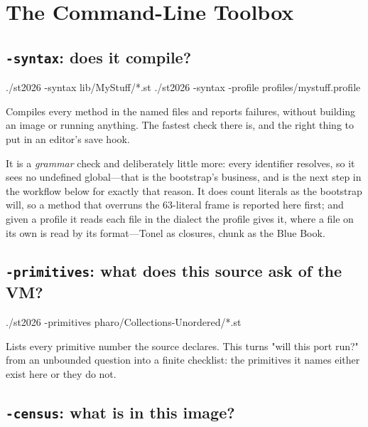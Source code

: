 \chapter{The Command-Line Toolbox}
\label{ch:toolbox}


\section{\texttt{-syntax}: does it compile?}

\begin{sh}
./st2026 -syntax lib/MyStuff/*.st
./st2026 -syntax -profile profiles/mystuff.profile
\end{sh}

Compiles every method in the named files and reports failures, without
building an image or running anything. The fastest check there is, and the
right thing to put in an editor's save hook.

It is a \emph{grammar} check and deliberately little more: every identifier
resolves, so it sees no undefined global---that is the bootstrap's business,
and  is the next step in the workflow below for exactly that
reason. It does count literals as the bootstrap will, so a method that
overruns the 63-literal frame is reported here first; and given a profile it
reads each file in the dialect the profile gives it, where a file on its own
is read by its format---Tonel as closures, chunk as the Blue Book.

\section{\texttt{-primitives}: what does this source ask of the VM?}

\begin{sh}
./st2026 -primitives pharo/Collections-Unordered/*.st
\end{sh}

Lists every primitive number the source declares. This turns "will this port
run?" from an unbounded question into a finite checklist: the primitives it
names either exist here or they do not.

\section{\texttt{-census}: what is in this image?}

